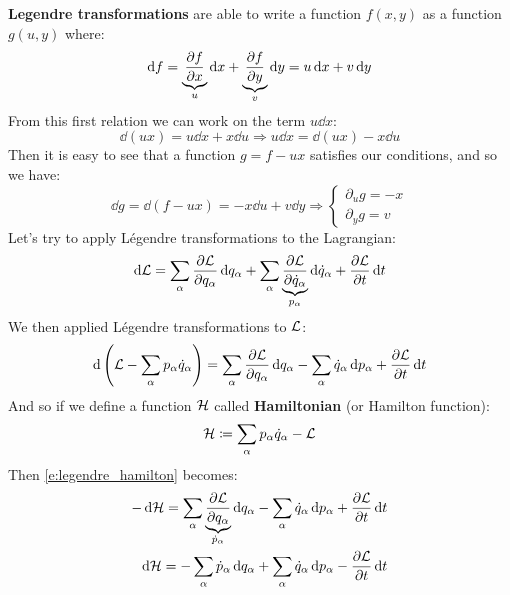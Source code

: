 \textbf{Legendre transformations} are able to write a function $f(x,y)$ as a function $g(u,y)$ where:
\begin{equation}
    \dd{f} = \underbrace{\pdv{f}{x}}_u \dd{x} + \underbrace{\pdv{f}{y}}_v \dd{y} = u\dd{x} + v\dd{y}
\end{equation}
From this first relation we can work on the term $u\dd{x}$:
\begin{equation}
    \dd{(ux)} = u\dd{x} + x\dd{u} \Rightarrow u\dd{x} = \dd{(ux)} - x\dd{u}
\end{equation}
Then it is easy to see that a function $g = f-ux$ satisfies our conditions, and so we have:
\begin{equation}
    \dd{g} = \dd{(f-ux)} = - x\dd{u} + v\dd{y} \Rightarrow \begin{cases}
        \partial_{u} g = -x\\
        \partial_{y} g = v
    \end{cases}
\end{equation}
Let's try to apply Légendre transformations to the Lagrangian:
\begin{equation}
    \dd{\lagr} = \bigsum_{\alpha} \pdv{\lagr}{q_{\alpha}}\dd{q_{\alpha}} + \bigsum_{\alpha} \underbrace{\pdv{\lagr}{\dot{q}_{\alpha}}}_{p_{\alpha}}\dd{\dot{q}_{\alpha}} + \pdv{\lagr}{t}\dd{t}
\end{equation}
We then applied Légendre transformations to $\mathcal{L}$:
\begin{equation} \label{e:legendre_hamilton}
    \dd{\brackets{\lagr - \bigsum_{\alpha} p_{\alpha}\dot{q}_{\alpha}}} = \bigsum_{\alpha} \pdv{\lagr}{q_{\alpha}}\dd{q_{\alpha}} - \bigsum_{\alpha} \dot{q}_{\alpha}\dd{p_{\alpha}} + \pdv{\lagr}{t}\dd{t}
\end{equation}
And so if we define a function $\mathcal{H}$ called \textbf{Hamiltonian} (or Hamilton function):
\begin{equation}
    \mathcal{H} \coloneqq \displaystyle\sum_{\alpha} p_{\alpha}\dot{q}_{\alpha} -\mathcal{L}
\end{equation}
Then \eqref{e:legendre_hamilton} becomes:
\begin{equation}
    \begin{split}
        -\dd{\hamfun} = \bigsum_{\alpha} \underbrace{\pdv{\lagr}{q_{\alpha}}}_{\dot{p}_{\alpha}}\dd{q_{\alpha}} - \bigsum_{\alpha} \dot{q}_{\alpha}\dd{p_{\alpha}} + \pdv{\lagr}{t}\dd{t}\\
        \dd{\hamfun} = -\bigsum_{\alpha} \dot{p}_{\alpha}\dd{q_{\alpha}} + \bigsum_{\alpha} \dot{q}_{\alpha}\dd{p_{\alpha}} - \pdv{\lagr}{t}\dd{t}\\
    \end{split}
\end{equation}
